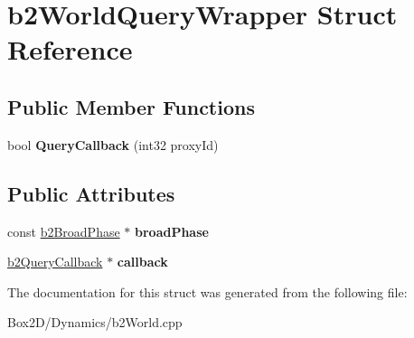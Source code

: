 \hypertarget{structb2_world_query_wrapper}{}\section{b2\+World\+Query\+Wrapper Struct Reference}
\label{structb2_world_query_wrapper}
\subsection*{Public Member Functions}
\begin{DoxyCompactItemize}
\item 
\mbox{\label{structb2_world_query_wrapper_a660a482e5a15b7f40a103b2dfb1711c1}} 
bool {\bfseries Query\+Callback} (int32 proxy\+Id)
\end{DoxyCompactItemize}
\subsection*{Public Attributes}
\begin{DoxyCompactItemize}
\item 
\mbox{\label{structb2_world_query_wrapper_ab85c542cfaf43d2ecf31fcbfd8c0c792}} 
const \hyperlink{classb2_broad_phase}{b2\+Broad\+Phase} $\ast$ {\bfseries broad\+Phase}
\item 
\mbox{\label{structb2_world_query_wrapper_a3af9f06dfa228974fecabd2bb2b07d2e}} 
\hyperlink{classb2_query_callback}{b2\+Query\+Callback} $\ast$ {\bfseries callback}
\end{DoxyCompactItemize}


The documentation for this struct was generated from the following file\+:\begin{DoxyCompactItemize}
\item 
Box2\+D/\+Dynamics/b2\+World.\+cpp\end{DoxyCompactItemize}
